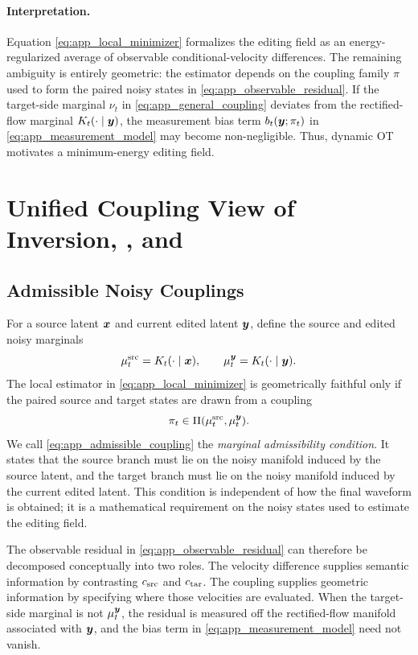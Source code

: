\paragraph{Interpretation.}
Equation \eqref{eq:app_local_minimizer} formalizes the editing field as an energy-regularized average of observable conditional-velocity differences.
The remaining ambiguity is entirely geometric: the estimator depends on the coupling family $\pi$ used to form the paired noisy states in \eqref{eq:app_observable_residual}.
If the target-side marginal $\nu_t$ in \eqref{eq:app_general_coupling} deviates from the rectified-flow marginal $K_t(\cdot\mid\boldsymbol{y})$, the measurement bias term $b_t(\boldsymbol{y};\pi_t)$ in \eqref{eq:app_measurement_model} may become non-negligible.
Thus, dynamic OT motivates a minimum-energy editing field.

\section{Unified Coupling View of Inversion, \method, and \methodplus}
\label{app:coupling_view}

\subsection{Admissible Noisy Couplings}

For a source latent $\boldsymbol{x}$ and current edited latent $\boldsymbol{y}$, define the source and edited noisy marginals
\begin{equation}
    \label{eq:app_noisy_marginals}
    \mu_t^{\mathrm{src}}=K_t(\cdot\mid\boldsymbol{x}),
    \qquad
    \mu_t^{\boldsymbol{y}}=K_t(\cdot\mid\boldsymbol{y}).
\end{equation}
The local estimator in \eqref{eq:app_local_minimizer} is geometrically faithful only if the paired source and target states are drawn from a coupling
\begin{equation}
    \label{eq:app_admissible_coupling}
    \pi_t\in\Pi(\mu_t^{\mathrm{src}},\mu_t^{\boldsymbol{y}}).
\end{equation}
We call \eqref{eq:app_admissible_coupling} the \emph{marginal admissibility condition}.
It states that the source branch must lie on the noisy manifold induced by the source latent, and the target branch must lie on the noisy manifold induced by the current edited latent.
This condition is independent of how the final waveform is obtained; it is a mathematical requirement on the noisy states used to estimate the editing field.

The observable residual in \eqref{eq:app_observable_residual} can therefore be decomposed conceptually into two roles.
The velocity difference supplies semantic information by contrasting $c_{\mathrm{src}}$ and $c_{\mathrm{tar}}$.
The coupling supplies geometric information by specifying where those velocities are evaluated.
When the target-side marginal is not $\mu_t^{\boldsymbol{y}}$, the residual is measured off the rectified-flow manifold associated with $\boldsymbol{y}$, and the bias term in \eqref{eq:app_measurement_model} need not vanish.

